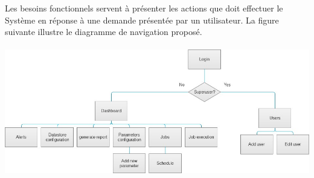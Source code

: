 \documentclass[oneside]{book}
\begin{document}
Les besoins fonctionnels servent à présenter les actions que doit effectuer le
Système en réponse à une demande présentée par un utilisateur. La figure suivante illustre le diagramme de navigation proposé.
\\
\\
\includegraphics[width=\textwidth]{img/pages.jpg}\\
\\
\end{document}

